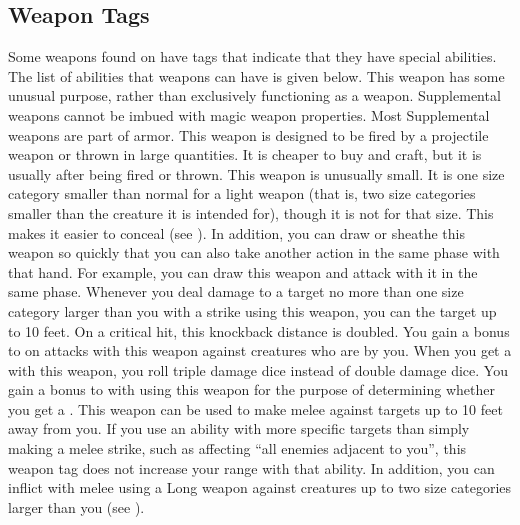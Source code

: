     \subsection{Weapon Tags}\label{Weapon Tags}
        Some weapons found on  have tags that indicate that they have special abilities. The list of abilities that weapons can have is given below.
         This weapon has some unusual purpose, rather than exclusively functioning as a weapon.
        Supplemental weapons cannot be imbued with magic weapon properties.
        Most Supplemental weapons are part of armor.
         This weapon is designed to be fired by a projectile weapon or thrown in large quantities.
        It is cheaper to buy and craft, but it is usually  after being fired or thrown.
         This weapon is unusually small.
        It is one size category smaller than normal for a light weapon (that is, two size categories smaller than the creature it is intended for), though it is not  for that size.
        This makes it easier to conceal (see ).
        In addition, you can draw or sheathe this weapon so quickly that you can also take another action in the same phase with that hand.
        For example, you can draw this weapon and attack with it in the same phase.
         Whenever you deal damage to a target no more than one size category larger than you with a strike using this weapon, you can  the target up to 10 feet.
        On a critical hit, this knockback distance is doubled.
         You gain a  bonus to  on  attacks with this weapon against creatures who are \grappled by you.
         When you get a  with this weapon, you roll triple damage dice instead of double damage dice.
         You gain a  bonus to  with  using this weapon for the purpose of determining whether you get a .
        \label{Long Weapon} This weapon can be used to make melee  against targets up to 10 feet away from you.
        If you use an ability with more specific targets than simply making a melee strike, such as affecting ``all enemies adjacent to you'', this weapon tag does not increase your range with that ability.
        In addition, you can inflict  with melee  using a Long weapon against creatures up to two size categories larger than you (see ).
